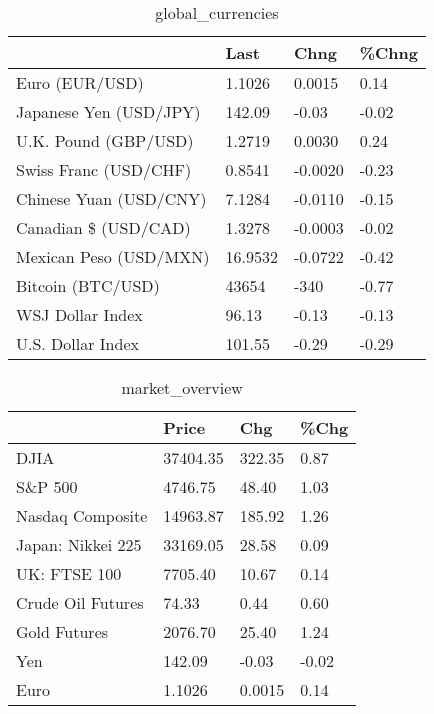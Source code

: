 \documentclass{article}%
\begin{document}
%


\begin{table}[htbp]%
\caption{global\_currencies}%
\centering%
\begin{adjustbox}{width=1\textwidth}%
\begin{tabular}{llll}
\toprule
                       &    Last &    Chng & \%Chng \\
\midrule
        Euro (EUR/USD) &  1.1026 &  0.0015 &  0.14 \\
Japanese Yen (USD/JPY) &  142.09 &   -0.03 & -0.02 \\
  U.K. Pound (GBP/USD) &  1.2719 &  0.0030 &  0.24 \\
 Swiss Franc (USD/CHF) &  0.8541 & -0.0020 & -0.23 \\
Chinese Yuan (USD/CNY) &  7.1284 & -0.0110 & -0.15 \\
  Canadian \$ (USD/CAD) &  1.3278 & -0.0003 & -0.02 \\
Mexican Peso (USD/MXN) & 16.9532 & -0.0722 & -0.42 \\
     Bitcoin (BTC/USD) &   43654 &    -340 & -0.77 \\
      WSJ Dollar Index &   96.13 &   -0.13 & -0.13 \\
     U.S. Dollar Index &  101.55 &   -0.29 & -0.29 \\
\bottomrule
\end{tabular}
%
\end{adjustbox}%
\end{table}

%


\begin{table}[htbp]%
\caption{market\_overview}%
\centering%
\begin{adjustbox}{width=1\textwidth}%
\begin{tabular}{llll}
\toprule
                  &    Price &    Chg &  \%Chg \\
\midrule
             DJIA & 37404.35 & 322.35 &  0.87 \\
          S\&P 500 &  4746.75 &  48.40 &  1.03 \\
 Nasdaq Composite & 14963.87 & 185.92 &  1.26 \\
Japan: Nikkei 225 & 33169.05 &  28.58 &  0.09 \\
     UK: FTSE 100 &  7705.40 &  10.67 &  0.14 \\
Crude Oil Futures &    74.33 &   0.44 &  0.60 \\
     Gold Futures &  2076.70 &  25.40 &  1.24 \\
              Yen &   142.09 &  -0.03 & -0.02 \\
             Euro &   1.1026 & 0.0015 &  0.14 \\
\bottomrule
\end{tabular}
%
\end{adjustbox}%
\end{table}

%
\end{document}
